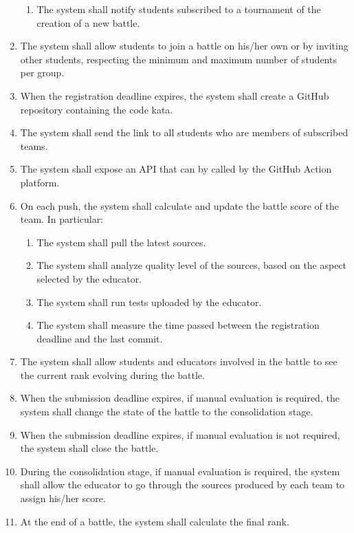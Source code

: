 \begin{enumerate}[label=\textbf{R\arabic*}:,leftmargin=1.3cm]
\begin{enumerate}[label=\textbf{R\arabic{enumi}.\arabic*}:, leftmargin=*]
                  \item The system shall notify students subscribed to a tournament of the creation of a new battle.
            \end{enumerate}
      \item The system shall allow students to join a battle on his/her own or by inviting other students, respecting the minimum and maximum number of students per group.
      \item When the registration deadline expires, the system shall create a GitHub repository containing the code kata.
      \item The system shall send the link to all students who are members of subscribed teams.
      \item The system shall expose an API that can by called by the GitHub Action platform.
      \item On each push, the system shall calculate and update the battle score of the team. In particular: 
            \begin{enumerate}[label=\textbf{R\arabic{enumi}.\arabic*}:, leftmargin=*]
                  \item The system shall pull the latest sources.
                  \item The system shall analyze quality level of the sources, based on the aspect selected by the educator.
                  \item The system shall run tests uploaded by the educator.
                  \item The system shall measure the time passed between the registration deadline and the last commit.
            \end{enumerate}
      \item The system shall allow students and educators involved in the battle to see the current rank evolving during the battle.
      \item When the submission deadline expires, if manual evaluation is required, the system shall change the state of the battle to the consolidation stage.
      \item When the submission deadline expires, if manual evaluation is not required, the system shall close the battle.
      \item During the consolidation stage, if manual evaluation is required, the system shall allow the educator to go through the sources produced by each team to assign his/her score.
      \item At the end of a battle, the system shall calculate the final rank.

\end{enumerate}
